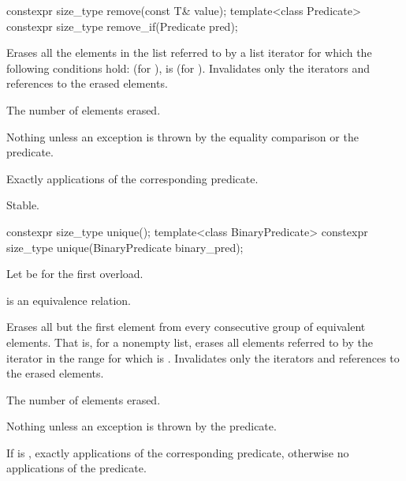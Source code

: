 %
%
\begin{itemdecl}
constexpr size_type remove(const T& value);
template<class Predicate> constexpr size_type remove_if(Predicate pred);
\end{itemdecl}

\begin{itemdescr}
\pnum
\effects
Erases all the elements in the list referred to by a list iterator  for
which the following conditions hold:  (for ),
 is  (for ).
Invalidates only the iterators and references to the erased elements.

\pnum
\returns
The number of elements erased.

\pnum
\throws
Nothing unless an exception is thrown by the equality comparison or the
predicate.

\pnum
\complexity
Exactly  applications of the corresponding
predicate.

\pnum
\remarks
Stable.
\end{itemdescr}

%
\begin{itemdecl}
constexpr size_type unique();
template<class BinaryPredicate> constexpr size_type unique(BinaryPredicate binary_pred);
\end{itemdecl}

\begin{itemdescr}
\pnum
Let  be  for the first overload.

\pnum
\expects
{} is an equivalence relation.

\pnum
\effects
Erases all but the first element from every consecutive
group of equivalent elements.
That is, for a nonempty list, erases all elements referred to
by the iterator  in the range 
for which  is .
Invalidates only the iterators and references to the erased elements.

\pnum
\returns
The number of elements erased.

\pnum
\throws
Nothing unless an exception is thrown by the predicate.

\pnum
\complexity
If  is ,
exactly  applications of
the corresponding predicate,
otherwise no applications of the predicate.
\end{itemdescr}

